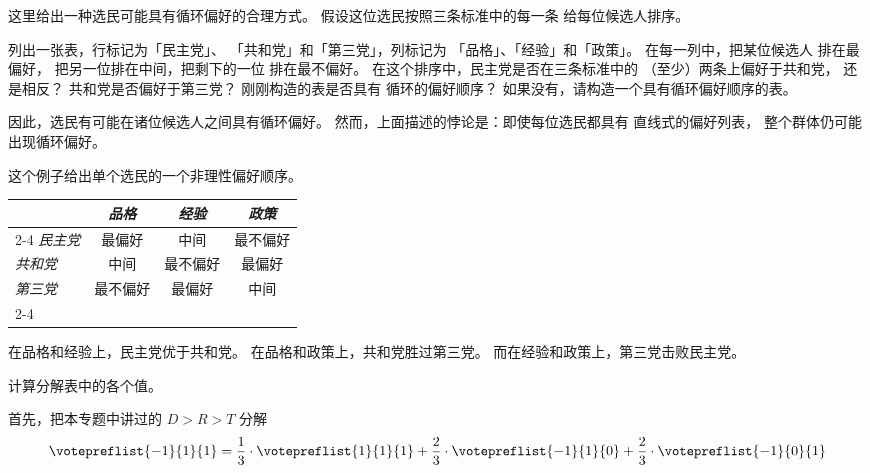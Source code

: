 \begin{exercises}
  \item \label{IrrIndVote}
    这里给出一种选民可能具有循环偏好的合理方式。
    假设这位选民按照三条标准中的每一条
    给每位候选人排序。
    \begin{exparts}
      \partsitem 列出一张表，行标记为「民主党」、
         「共和党」和「第三党」，列标记为
         「品格」、「经验」和「政策」。
         在每一列中，把某位候选人
         排在最偏好，
         把另一位排在中间，把剩下的一位
         排在最不偏好。
      \partsitem 在这个排序中，民主党是否在三条标准中的
         （至少）两条上偏好于共和党，
         还是相反？
         共和党是否偏好于第三党？
      \partsitem 刚刚构造的表是否具有
         循环的偏好顺序？
         如果没有，请构造一个具有循环偏好顺序的表。
    \end{exparts}
    因此，选民有可能在诸位候选人之间具有循环偏好。
    然而，上面描述的悖论是：即使每位选民都具有
    直线式的偏好列表，
    整个群体仍可能出现循环偏好。
    \begin{answer}
      这个例子给出单个选民的一个非理性偏好顺序。
      \smallskip
      \begin{center}
        \begin{tabular}{l|c|c|c|}
             \multicolumn{1}{c}{\ }
                  &\multicolumn{1}{c}{\textit{品格}}
                  &\multicolumn{1}{c}{\textit{经验}}
                  &\multicolumn{1}{c}{\textit{政策}}   \\ 
          \cline{2-4}
         \textit{民主党}   &最偏好    &中间  &最不偏好   \\
         \textit{共和党} &中间  &最不偏好   &最偏好    \\
         \textit{第三党}      &最不偏好   &最偏好    &中间  \\
          \cline{2-4}
        \end{tabular}
      \end{center}
      \smallskip
      在品格和经验上，民主党优于共和党。
      在品格和政策上，共和党胜过第三党。
      而在经验和政策上，第三党击败民主党。
    \end{answer}
  \item \label{VoteCalcTable} 
    计算分解表中的各个值。
    \begin{answer}
      首先，把本专题中讲过的 $D>R>T$ 分解
      \begin{equation*}
        \votepreflist{-1}{1}{1}
          =\frac{1}{3}\cdot\votepreflist{1}{1}{1}
           +\frac{2}{3}\cdot\votepreflist{-1}{1}{0}
           +\frac{2}{3}\cdot\votepreflist{-1}{0}{1}

\end{equation*}
\end{answer}
\end{exercises}
